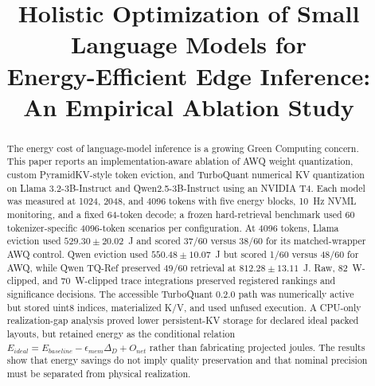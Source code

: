 \documentclass[conference]{IEEEtran}
\begin{document}
\title{Holistic Optimization of Small Language Models for\\Energy-Efficient Edge Inference:\\An Empirical Ablation Study}

\author{
  \and
  \and
}



\maketitle

\begin{abstract}
The energy cost of language-model inference is a growing Green Computing concern. This paper reports an implementation-aware ablation of AWQ weight quantization, custom PyramidKV-style token eviction, and TurboQuant numerical KV quantization on Llama 3.2-3B-Instruct and Qwen2.5-3B-Instruct using an NVIDIA T4. Each model was measured at 1024, 2048, and 4096 tokens with five energy blocks, 10~Hz NVML monitoring, and a fixed 64-token decode; a frozen hard-retrieval benchmark used 60 tokenizer-specific 4096-token scenarios per configuration. At 4096 tokens, Llama eviction used $529.30\pm20.02$~J and scored 37/60 versus 38/60 for its matched-wrapper AWQ control. Qwen eviction used $550.48\pm10.07$~J but scored 1/60 versus 48/60 for AWQ, while Qwen TQ-Ref preserved 49/60 retrieval at $812.28\pm13.11$~J. Raw, 82~W-clipped, and 70~W-clipped trace integrations preserved registered rankings and significance decisions. The accessible TurboQuant 0.2.0 path was numerically active but stored uint8 indices, materialized K/V, and used unfused execution. A CPU-only realization-gap analysis proved lower persistent-KV storage for declared ideal packed layouts, but retained energy as the conditional relation $E_{ideal}=E_{baseline}-\epsilon_{mem}\Delta_D+O_{net}$ rather than fabricating projected joules. The results show that energy savings do not imply quality preservation and that nominal precision must be separated from physical realization.
\end{abstract}
\end{document}

